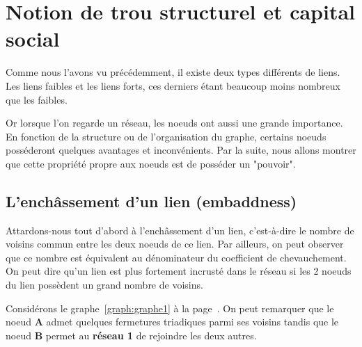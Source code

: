 \section{Notion de trou structurel et capital social}
Comme nous l'avons vu précédemment, il existe deux types différents de liens. Les liens faibles et les liens forts, ces derniers étant beaucoup moins nombreux que les faibles.

Or lorsque l'on regarde un réseau, les noeuds ont aussi une grande importance. En fonction de la structure ou de l'organisation du graphe, certains noeuds posséderont quelques avantages et inconvénients. 
Par la suite, nous allons montrer que cette propriété propre aux noeuds est de posséder un "pouvoir".

\subsection{L'enchâssement d'un lien (embaddness)}
Attardons-nous tout d'abord à l'enchâssement d'un lien, c'est-à-dire le nombre de voisins commun entre les deux noeuds de ce lien. Par ailleurs, on peut observer que ce nombre est équivalent au dénominateur du coefficient de chevauchement.
On peut dire qu'un lien est plus fortement incrusté dans le réseau si les 2 noeuds du lien possèdent un grand nombre de voisins. 

Considérons le graphe~\ref{graph:graphe1} à la page~\pageref{graph:graphe1}. On peut remarquer que le noeud \textbf{A} admet quelques fermetures triadiques parmi ses voisins tandis que le noeud \textbf{B} permet au \textbf{réseau 1} de rejoindre les deux autres.

